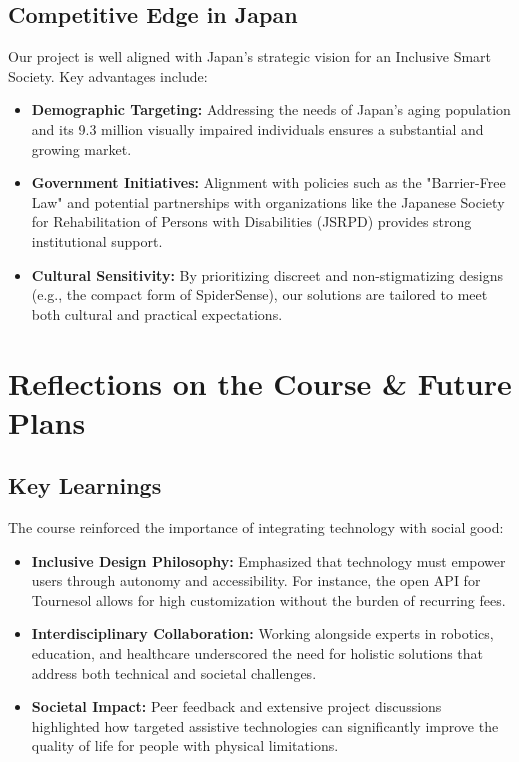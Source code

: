 \documentclass[12pt,a4paper]{article}
\begin{document}
\subsection{Competitive Edge in Japan}
Our project is well aligned with Japan's strategic vision for an Inclusive Smart Society. Key advantages include:
\begin{itemize}[leftmargin=*, label=\textbullet]
    \item \textbf{Demographic Targeting:} Addressing the needs of Japan's aging population and its 9.3 million visually impaired individuals ensures a substantial and growing market.
    \item \textbf{Government Initiatives:} Alignment with policies such as the "Barrier-Free Law" and potential partnerships with organizations like the Japanese Society for Rehabilitation of Persons with Disabilities (JSRPD) provides strong institutional support.
    \item \textbf{Cultural Sensitivity:} By prioritizing discreet and non-stigmatizing designs (e.g., the compact form of SpiderSense), our solutions are tailored to meet both cultural and practical expectations.
\end{itemize}

\section{Reflections on the Course \& Future Plans}

\subsection{Key Learnings}
The course reinforced the importance of integrating technology with social good:
\begin{itemize}[leftmargin=*, label=\textbullet]
    \item \textbf{Inclusive Design Philosophy:} Emphasized that technology must empower users through autonomy and accessibility. For instance, the open API for Tournesol allows for high customization without the burden of recurring fees.
    \item \textbf{Interdisciplinary Collaboration:} Working alongside experts in robotics, education, and healthcare underscored the need for holistic solutions that address both technical and societal challenges.
    \item \textbf{Societal Impact:} Peer feedback and extensive project discussions highlighted how targeted assistive technologies can significantly improve the quality of life for people with physical limitations.
\end{itemize}
\end{document}
